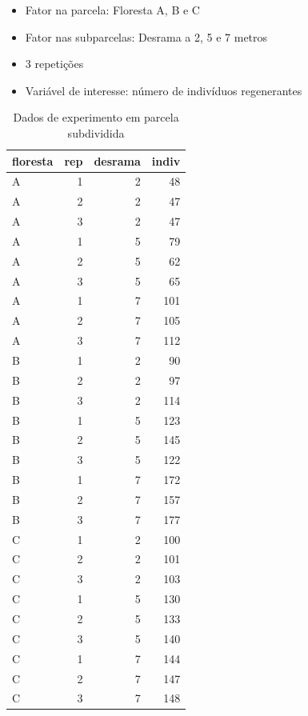 \documentclass[
]{article}
\providecommand{\tightlist}{%
  \setlength{\itemsep}{0pt}\setlength{\parskip}{0pt}}
\begin{document}
\begin{itemize}
\tightlist
\item
  Fator na parcela: Floresta A, B e C
\item
  Fator nas subparcelas: Desrama a 2, 5 e 7 metros
\item
  3 repetições
\item
  Variável de interesse: número de indivíduos regenerantes
\end{itemize}

\begin{table}

\caption{\label{tab:unnamed-chunk-141}Dados de experimento em parcela subdividida}
\centering
\begin{tabular}[t]{l|r|r|r}
\hline
floresta & rep & desrama & indiv\\
\hline
A & 1 & 2 & 48\\
\hline
A & 2 & 2 & 47\\
\hline
A & 3 & 2 & 47\\
\hline
A & 1 & 5 & 79\\
\hline
A & 2 & 5 & 62\\
\hline
A & 3 & 5 & 65\\
\hline
A & 1 & 7 & 101\\
\hline
A & 2 & 7 & 105\\
\hline
A & 3 & 7 & 112\\
\hline
B & 1 & 2 & 90\\
\hline
B & 2 & 2 & 97\\
\hline
B & 3 & 2 & 114\\
\hline
B & 1 & 5 & 123\\
\hline
B & 2 & 5 & 145\\
\hline
B & 3 & 5 & 122\\
\hline
B & 1 & 7 & 172\\
\hline
B & 2 & 7 & 157\\
\hline
B & 3 & 7 & 177\\
\hline
C & 1 & 2 & 100\\
\hline
C & 2 & 2 & 101\\
\hline
C & 3 & 2 & 103\\
\hline
C & 1 & 5 & 130\\
\hline
C & 2 & 5 & 133\\
\hline
C & 3 & 5 & 140\\
\hline
C & 1 & 7 & 144\\
\hline
C & 2 & 7 & 147\\
\hline
C & 3 & 7 & 148\\
\hline
\end{tabular}
\end{table}
\end{document}
